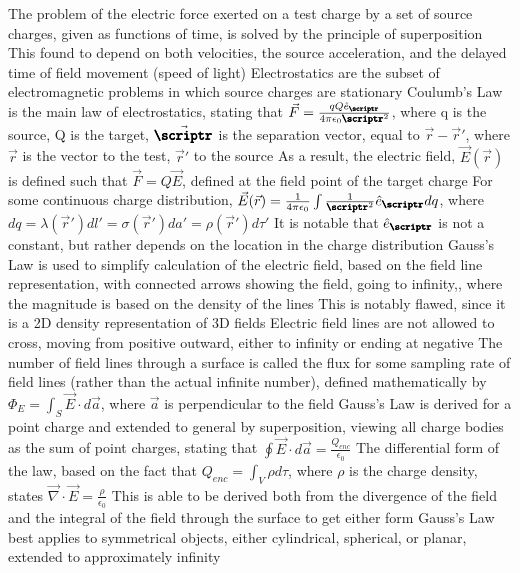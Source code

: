\documentclass[11 pt, twoside]{article}
\newenvironment{outline*}
{
	\begin{outline}[enumerate]
	}
	{\end{outline}
}
\begin{document}
\begin{outline*}
\1 The problem of the electric force exerted on a test charge by a set of source charges, given as functions of time, is solved by the principle of superposition
	\2 This found to depend on both velocities, the source acceleration, and the delayed time of field movement (speed of light)
	\2 Electrostatics are the subset of electromagnetic problems in which source charges are stationary
\1 Coulumb's Law is the main law of electrostatics, stating that $\vec{F} = \frac{qQ\hat{e}_{\pmb{\scriptr}}}{4\pi\epsilon_0\pmb{\scriptr}^2}$, where q is the source, Q is the target, $\vec{\pmb{\scriptr}}$ is the separation vector, equal to $\vec{r} - \vec{r}'$, where $\vec{r}$ is the vector to the test, $\vec{r}'$ to the source
	\2 As a result, the electric field, $\vec{E}(\vec{r})$ is defined such that $\vec{F} = Q\vec{E}$, defined at the field point of the target charge
	\2 For some continuous charge distribution, $\vec{E}(\vec{r}) = \frac{1}{4\pi\epsilon_0}\int\frac{1}{\pmb{\scriptr}^2}\hat{e}_{\pmb{\scriptr}}dq$, where $dq = \lambda(\vec{r}') dl' = \sigma(\vec{r}') da' = \rho(\vec{r}') d\tau'$
		\3 It is notable that $\hat{e}_{\pmb{\scriptr}}$ is not a constant, but rather depends on the location in the charge distribution
\1 Gauss's Law is used to simplify calculation of the electric field, based on the field line representation, with connected arrows showing the field, going to infinity,, where the magnitude is based on the density of the lines
	\2 This is notably flawed, since it is a 2D density representation of 3D fields
		\3 Electric field lines are not allowed to cross, moving from positive outward, either to infinity or ending at negative
	\2 The number of field lines through a surface is called the flux for some sampling rate of field lines (rather than the actual infinite number), defined mathematically by $\Phi_E = \int_S \vec{E} \cdot d\vec{a}$, where $\vec{a}$ is perpendicular to the field
	\2 Gauss's Law is derived for a point charge and extended to general by superposition, viewing all charge bodies as the sum of point charges, stating that $\oint \vec{E} \cdot d\vec{a} = \frac{Q_{enc}}{\epsilon_0}$
		\3 The differential form of the law, based on the fact that $Q_{enc} = \int_V \rho d\tau$, where $\rho$ is the charge density, states $\vec{\nabla} \cdot \vec{E} = \frac{\rho}{\epsilon_0}$
		\3 This is able to be derived both from the divergence of the field and the integral of the field through the surface to get either form
	\2 Gauss's Law best applies to symmetrical objects, either cylindrical, spherical, or planar, extended to approximately infinity

\end{outline*}
\end{document}
